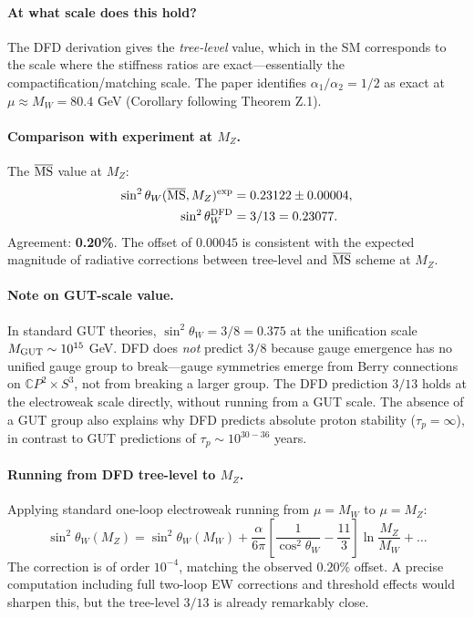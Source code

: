 \paragraph{At what scale does this hold?}
The DFD derivation gives the \emph{tree-level} value, which in the SM corresponds to the
scale where the stiffness ratios are exact---essentially the compactification/matching scale.
The paper identifies $\alpha_1/\alpha_2 = 1/2$ as exact at $\mu \approx M_W = 80.4$ GeV
(Corollary following Theorem Z.1).

\paragraph{Comparison with experiment at $M_Z$.}
The $\overline{\rm MS}$ value at $M_Z$:
\begin{align}
\sin^2\theta_W(\overline{\rm MS}, M_Z)^{\rm exp} &= 0.23122 \pm 0.00004, \\
\sin^2\theta_W^{\rm DFD} &= 3/13 = 0.23077.
\end{align}
Agreement: \textbf{0.20\%}. The offset of $0.00045$ is consistent with the expected
magnitude of radiative corrections between tree-level and $\overline{\rm MS}$ scheme
at $M_Z$.

\paragraph{Note on GUT-scale value.}
In standard GUT theories, $\sin^2\theta_W = 3/8 = 0.375$ at the unification scale
$M_{\rm GUT} \sim 10^{15}$ GeV. DFD does \emph{not} predict $3/8$ because gauge
emergence has no unified gauge group to break---gauge symmetries emerge from Berry
connections on $\mathbb{C}P^2 \times S^3$, not from breaking a larger group. The DFD
prediction $3/13$ holds at the electroweak scale directly, without running from a
GUT scale. The absence of a GUT group also explains why DFD predicts absolute proton
stability ($\tau_p = \infty$), in contrast to GUT predictions of $\tau_p \sim 10^{30-36}$ years.

\paragraph{Running from DFD tree-level to $M_Z$.}
Applying standard one-loop electroweak running from $\mu = M_W$ to $\mu = M_Z$:
\begin{equation}
\sin^2\theta_W(M_Z) = \sin^2\theta_W(M_W) + \frac{\alpha}{6\pi}
\left[\frac{1}{\cos^2\theta_W} - \frac{11}{3}\right]\ln\frac{M_Z}{M_W} + \ldots
\end{equation}
The correction is of order $10^{-4}$, matching the observed $0.20\%$ offset. A precise
computation including full two-loop EW corrections and threshold effects would sharpen
this, but the tree-level $3/13$ is already remarkably close.


